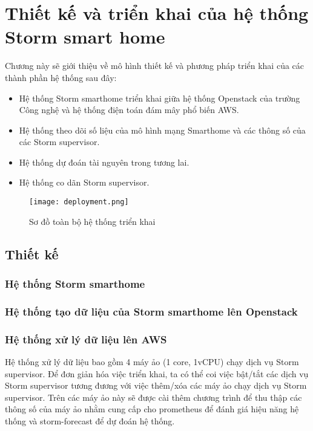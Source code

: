
\chapter{Thiết kế và triển khai của hệ thống Storm smart home}

Chương này sẽ giới thiệu về mô hình thiết kế và phương pháp triển khai của các thành phần hệ thống sau đây:
\begin{itemize}
    \item Hệ thống Storm smarthome triển khai giữa hệ thống Openstack của trường Công nghệ và hệ thống điện toán đám mây phổ biến AWS.
    \item Hệ thống theo dõi số liệu của mô hình mạng Smarthome và các thông số của các Storm supervisor.
    \item Hệ thống dự đoán tài nguyên trong tương lai.
    \item Hệ thống co dãn Storm supervisor.
\end{itemize}

\begin{figure}
    \texttt{[image: deployment.png]}
    \caption{Sơ đồ toàn bộ hệ thống triển khai}
    \label{}
\end{figure}

\section{Thiết kế}

\subsection{Hệ thống Storm smarthome}

\subsection{Hệ thống tạo dữ liệu của Storm smarthome lên Openstack}

\subsection{Hệ thống xử lý dữ liệu lên AWS}
Hệ thống xử lý dữ liệu bao gồm 4 máy ảo (1 core, 1vCPU) chạy dịch vụ Storm supervisor. Để đơn giản hóa việc triển khai, ta có thể coi việc bật/tắt các dịch vụ Storm supervisor tương đương với việc thêm/xóa các máy ảo chạy dịch vụ Storm supervisor.
Trên các máy ảo này sẽ được cài thêm chương trình \autocite{prometheus_node_exporter} để thu thập các thông số của máy ảo nhằm cung cấp cho prometheus để đánh giá hiệu năng hệ thống và storm-forecast để dự đoán hệ thống.

